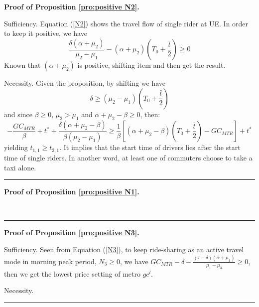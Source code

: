 \documentclass[a4paper,11pt]{article}
\newenvironment{proof}[1][Proof]{\noindent\textbf{#1.} }{\ \rule{0.5em}{0.5em}}
\begin{document}
\begin{proof}[Proof of Proposition \ref{pro:positive N2}]

\noindent Sufficiency. Equation (\ref{N2}) shows the travel flow of single rider at UE. In order to keep it positive, we have
\begin{equation*}
    \frac{\delta\left(\alpha+\mu_2\right)}{\mu_2-\mu_1}-\left(\alpha+\mu_2\right)\left(T_0+\frac{\bar{t}}{2}\right) \geq 0
\end{equation*}
Known that $(\alpha+\mu_2)$ is positive, shifting item and then get the result.

\noindent Necessity. Given the proposition, by shifting we have 
\begin{equation*}
    \delta \geq(\mu_2-\mu_1)(T_0+\frac{\bar{t}}{2})
\end{equation*}
and since $\beta \geq{0}$, $\mu_2 >\mu_1$ and $\alpha+\mu_2-\beta \geq{0}$, then: 
\begin{equation*}
    -\frac{GC_{MTR}}{\beta}+t^\ast+\frac{\delta\left(\alpha+\mu_2-\beta\right)}{\beta\left(\mu_2-\mu_1\right)} \geq{\frac{1}{\beta}\left[\left(\alpha+\mu_2-\beta\right)\left(T_0+\frac{\bar{t}}{2}\right)-GC_{MTR}\right]+t^*}
\end{equation*}
yielding $t_{1,1} \geq{t_{2,1}}$. It implies that the start time of drivers lies after the start time of single riders. In another word, at least one of commuters choose to take a taxi alone.
\end{proof}

\begin{proof}[Proof of Proposition \ref{pro:positive N1}]

\end{proof}

\begin{proof}[Proof of Proposition \ref{pro:positive N3}] 

\noindent Sufficiency. Seen from Equation (\ref{N3}), to keep ride-sharing as an active travel mode in morning peak period, $N_3 \geq 0 $, we have $GC_{MTR}-\delta-\frac{\left(\tau-\delta\right)\left(\alpha+\mu_1\right)}{\mu_1-\mu_3} \geq 0$, then we get the lowest price setting of metro $gc^l$.

\noindent Necessity.  %
\end{proof}
\end{document}

